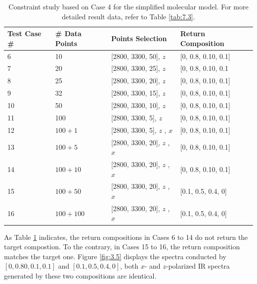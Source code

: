 \begin{table} \small
\begin{center}
{\def\arraystretch{1.5}
\begin{tabular}{| p{3cm} | p{3cm} | p{4cm} | l |} \hline
	Test Case \# & \# Data Points & Points Selection & Return Composition \\ \hline
	6 & 10 & [2800, 3300, 50], $z$ & [0, 0.8, 0.10, 0.1] \\ \hline
	7 & 20 & [2800, 3300, 25], $z$ & [0, 0.8, 0.10, 0.1 \\ \hline
	8 & 25 & [2800, 3300, 20], $z$ & [0, 0.8, 0.10, 0.1] \\ \hline
	9 & 32 & [2800, 3300, 15], $z$ & [0, 0.8, 0.10, 0.1] \\ \hline
	10 & 50 & [2800, 3300, 10], $z$ & [0, 0.8, 0.10, 0.1] \\ \hline
	11 & 100 & [2800, 3300, 5], $z$ & [0, 0.8, 0.10, 0.1] \\ \hline
	12 & $100 + 1$ & [2800, 3300, 5], $z$ \newline [2800, 3300, 500], $x$ & [0, 0.8, 0.10, 0.1] \\ \hline
	13 & $100 + 5$ & [2800, 3300, 20], $z$ \newline [2800, 3300, 100], $x$ & [0, 0.8, 0.10, 0.1] \\ \hline
	14 & $100 + 10$ & [2800, 3300, 20], $z$ \newline  [2800, 3300, 50], $x$ & [0, 0.8, 0.10, 0.1] \\ \hline
	15 & $100 + 50$ & [2800, 3300, 20], $z$ \newline  [2800, 3300, 10], $x$ & [0.1, 0.5, 0.4, 0] \\ \hline
	16 & $100 + 100$ & [2800, 3300, 20], $z$ \newline  [2800, 3300, 5], $x$ & [0.1, 0.5, 0.4, 0] \\ 
	\hline
\end{tabular} 
}
\end{center}
\caption{Constraint study based on Case 4 for the simplified molecular model. For more detailed result data, refer to Table \ref{tab:7.3}.} \label{tab:3.4}
\end{table}

As Table \ref{tab:3.4} indicates, the return compositions in Cases 6 to 14 do not return the target compostion. To the contrary, in Cases 15 to 16, the return composition matches the target one. Figure \ref{fig:3.5} displays the spectra conducted by $[0, 0.80, 0.1, 0.1]$  and $[0.1, 0.5, 0.4, 0]$, both $x$- and $z$-polarized IR spectra generated by these two compositions are identical.

